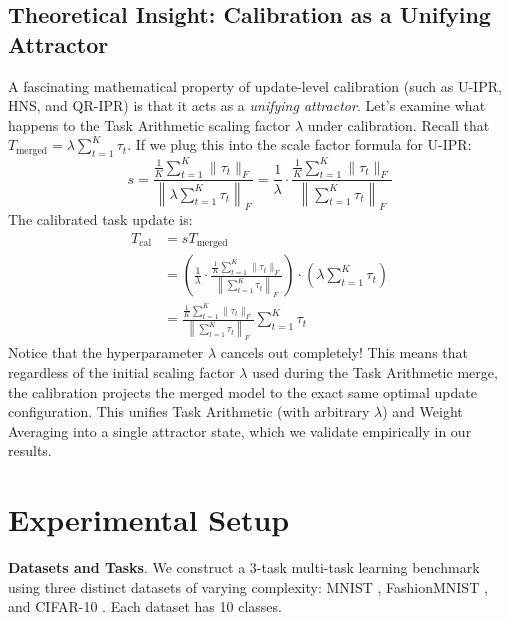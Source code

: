 \documentclass{article}
\theoremstyle{plain}
\theoremstyle{definition}
\theoremstyle{remark}
\begin{document}
\subsection{Theoretical Insight: Calibration as a Unifying Attractor}
A fascinating mathematical property of update-level calibration (such as U-IPR, HNS, and QR-IPR) is that it acts as a \emph{unifying attractor}. Let's examine what happens to the Task Arithmetic scaling factor $\lambda$ under calibration.
Recall that $T_{\text{merged}} = \lambda \sum_{t=1}^{K} \tau_t$. If we plug this into the scale factor formula for U-IPR:
\begin{equation}
    s = \frac{\frac{1}{K} \sum_{t=1}^{K} \|\tau_t\|_F}{\left\|\lambda \sum_{t=1}^{K} \tau_t\right\|_F} = \frac{1}{\lambda} \cdot \frac{\frac{1}{K} \sum_{t=1}^{K} \|\tau_t\|_F}{\left\|\sum_{t=1}^{K} \tau_t\right\|_F}
\end{equation}
The calibrated task update is:
\begin{align}
    T_{\text{cal}} &= s T_{\text{merged}} \nonumber\\
    &= \left( \frac{1}{\lambda} \cdot \frac{\frac{1}{K} \sum_{t=1}^{K} \|\tau_t\|_F}{\left\|\sum_{t=1}^{K} \tau_t\right\|_F} \right) \cdot \left( \lambda \sum_{t=1}^{K} \tau_t \right) \nonumber\\
    &= \frac{\frac{1}{K} \sum_{t=1}^{K} \|\tau_t\|_F}{\left\|\sum_{t=1}^{K} \tau_t\right\|_F} \sum_{t=1}^{K} \tau_t
\end{align}
Notice that the hyperparameter $\lambda$ cancels out completely! This means that regardless of the initial scaling factor $\lambda$ used during the Task Arithmetic merge, the calibration projects the merged model to the exact same optimal update configuration. This unifies Task Arithmetic (with arbitrary $\lambda$) and Weight Averaging into a single attractor state, which we validate empirically in our results.

\vspace{-2.0mm}
\section{Experimental Setup}
\label{sec:setup}
\vspace{-2.5mm}

\textbf{Datasets and Tasks}. We construct a 3-task multi-task learning benchmark using three distinct datasets of varying complexity: MNIST \cite{lecun1998gradient}, FashionMNIST \cite{xiao2017fashion}, and CIFAR-10 \cite{krizhevsky2009learning}. Each dataset has 10 classes.
\end{document}
